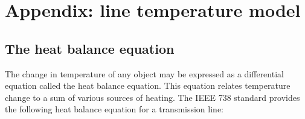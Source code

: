 \documentclass[conference]{IEEEtran}
\begin{document}

\section{Appendix: line temperature model}\label{sec:temp}

\subsection{The heat balance equation}

The change in temperature of any object may be expressed as a differential equation called the heat balance equation. This equation
relates temperature change to a sum of various sources of heating. The IEEE 738 standard \cite{ieee2013} provides the following heat balance equation for a transmission line:
\end{document}
